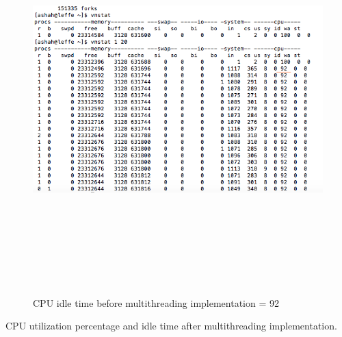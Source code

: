 \begin{figure}[htb]
\centering
\includegraphics[width=16cm,height=15cm,keepaspectratio]{image/cpu-wa-1.png}
\caption[CPU idle time before multithreading implementation]{CPU idle time before multithreading implementation = 92} 
\label{fig:cpu-wa-1}
\end{figure}

CPU utilization percentage and idle time after multithreading implementation.

